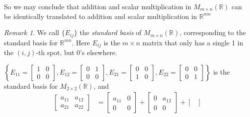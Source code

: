 \documentclass{beamer}
\theoremstyle{definition}
\theoremstyle{remark}
\newtheorem*{remark}{Remark}
\begin{document}
\begin{frame}[t]
\begin{example}
\begin{center}
\end{center}\pause
So we may conclude that addition and scalar multiplication in $M_{m\times n}(\mathbb R)$ can be identically translated to addition and scalar multiplication in $\mathbb R^{mn}$
\end{example}
\end{frame}

\begin{frame}[t]
\begin{remark}
We call $\{E_{ij}\}$ the \textit{standard basis} of $M_{m\times n}(\mathbb R)$, corresponding to the standard basis for $\mathbb R^{mn}$. Here $E_{ij}$ is the $m\times n$ matrix that only has a single 1 in the $(i,j)$-th spot, but 0's elsewhere.
\end{remark}
\pause
\begin{example}
$\left\{E_{11}=\begin{bmatrix}
1&0\\0&0
\end{bmatrix},E_{12}=\begin{bmatrix}
0&1\\0&0
\end{bmatrix},E_{21}=\begin{bmatrix}
0&0\\1&0
\end{bmatrix},E_{22}=\begin{bmatrix}
0&0\\0&1
\end{bmatrix}\right\}$ is the standard basis for $M_{2\times2}(\mathbb R)$, and
\begin{align*}
\begin{bmatrix}
a_{11}&a_{12}\\a_{21}&a_{22}
\end{bmatrix}&=\begin{bmatrix}
a_{11}&0\\0&0
\end{bmatrix}+\begin{bmatrix}
0&a_{12}\\0&0
\end{bmatrix}+\begin{bmatrix}

\end{bmatrix}
\end{align*}
\end{example}
\end{frame}
\end{document}
